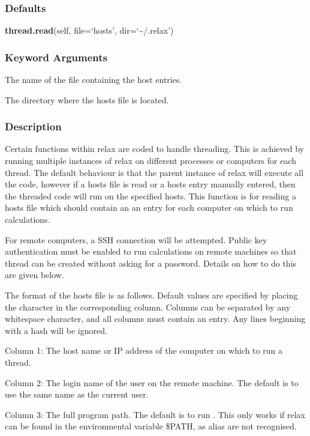   
 \subsubsection{Defaults} 

 \textsf{\textbf{thread.read}(self, file=`hosts', dir=`\~{}/.relax')} 

  
 \subsubsection{Keyword Arguments} 

   The name of the file containing the host entries.   

   The directory where the hosts file is located.  

  

  
 \subsubsection{Description} 

 Certain functions within relax are coded to handle threading.  This is achieved by running multiple instances of relax on different processes or computers for each thread.  The default behaviour is that the parent instance of relax will execute all the code, however if a hosts file is read or a hosts entry manually entered, then the threaded code will run on the specified hosts.  This function is for reading a hosts file which should contain an an entry for each computer on which to run calculations. 
  

 For remote computers, a SSH connection will be attempted.  Public key authentication must be enabled to run calculations on remote machines so that thread can be created without asking for a password.  Details on how to do this are given below. 
  

 The format of the hosts file is as follows.  Default values are specified by placing the character \quotecmd{-} in the corresponding column.  Columns can be separated by any whitespace character, and all columns must contain an entry.  Any lines beginning with a hash will be ignored. 
  

 Column 1:  The host name or IP address of the computer on which to run a thread. 
  

 Column 2:  The login name of the user on the remote machine.  The default is to use the same name as the current user. 
  

 Column 3:  The full program path.  The default is to run .  This only works if relax can be found in the environmental variable \$PATH, as alias are not recognised. 
  


